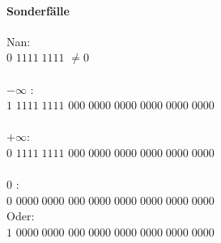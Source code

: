 \documentclass[a4paper]{scrartcl}
\begin{document}
	\paragraph{Sonderfälle}
			Nan:\\
			\colorbox{green!30}{$0$} \colorbox{blue!30}{$1111\;1111$} \colorbox{red!30}{$ \neq 0 $}\\
			\\
			\(- \infty\) :\\
			\colorbox{green!30}{$1$} \colorbox{blue!30}{$1111\;1111$} \colorbox{red!30}{$000\; 0000\; 0000\; 0000\; 0000\; 0000$}\\
			\\
			\(+ \infty\):\\
			\colorbox{green!30}{$0$} \colorbox{blue!30}{$1111\;1111$} \colorbox{red!30}{$000\; 0000\; 0000\; 0000\; 0000\; 0000$}\\
			\\
			0 :\\
			\colorbox{green!30}{$0$} \colorbox{blue!30}{$0000\;0000$} \colorbox{red!30}{$000\; 0000\; 0000\; 0000\; 0000\; 0000$}\\
			Oder:\\
			\colorbox{green!30}{$1$} \colorbox{blue!30}{$0000\;0000$} \colorbox{red!30}{$000\; 0000\; 0000\; 0000\; 0000\; 0000$}\\
			
\end{document}
